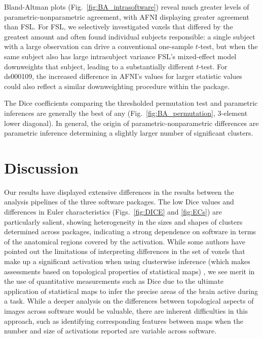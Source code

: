 Bland-Altman plots (Fig.\ \ref{fig:BA_intrasoftware}) reveal much greater levels of parametric-nonparametric agreement, with AFNI displaying greater agreement than FSL. For FSL, we selectively investigated voxels that differed by the greatest amount and often found individual subjects responsible: a single subject with a large observation can drive a conventional one-sample $t$-test, but when the same subject also has large intrasubject variance FSL's mixed-effect model downweights that subject, leading to a substantially different $t$-test. For ds000109, the increased difference in AFNI's values for larger statistic values could also reflect a similar downweighting procedure within the package.

The Dice coefficients comparing the thresholded permutation test and parametric inferences are generally the best of any (Fig.\ \ref{fig:BA_permutation}, 3-element lower diagonal). In general, the origin of parametric-nonparametric differences are parametric inference determining a slightly larger number of significant clusters.

\section{Discussion}

Our results have displayed extensive differences in the results between the analysis pipelines of the three software packages. The low Dice values and differences in Euler characteristics (Figs.\ \ref{fig:DICE} and \ref{fig:ECs}) are particularly salient, showing heterogeneity in the sizes and shapes of clusters determined across packages, indicating a strong dependence on software in terms of the anatomical regions covered by the activation. While some authors have pointed out the limitations of interpreting differences in the set of voxels that make up a significant activation when using clusterwise inference (which makes assessments based on topological properties of statistical maps) \citep{Chumbley2009-ce}, we see merit in the use of quantitative measurements such as Dice due to the ultimate application of statistical maps to infer the precise areas of the brain active during a task. While a deeper analysis on the differences between topological aspects of images across software would be valuable, there are inherent difficulties in this approach, such as identifying corresponding features between maps when the number and size of activations reported are variable across software.

